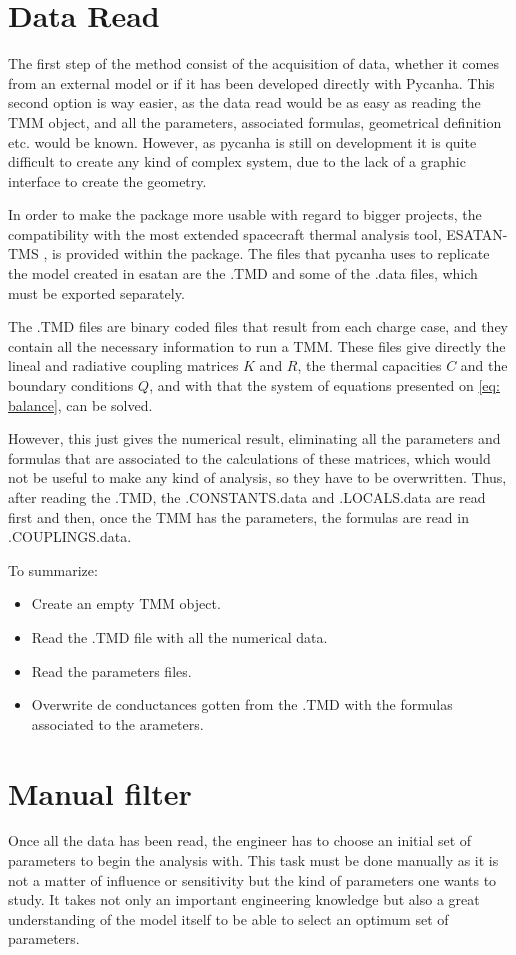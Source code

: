 \section{Data Read}
The first step of the method consist of the acquisition of data, whether it comes from an external model or if it has been developed directly with Pycanha. This second option is way easier, as the data read would be as easy as reading the TMM object, and all the parameters, associated formulas, geometrical definition etc. would be known. However, as pycanha is still on development it is quite difficult to create any kind of complex system, due to the lack of a graphic interface to create the geometry. 

In order to make the package more usable with regard to bigger projects, the compatibility with the most extended  spacecraft thermal analysis tool, ESATAN-TMS \cite{esatan-tms}, is provided within the package. The files that pycanha uses to replicate the model created in esatan are the .TMD and some of the .data files, which must be exported separately.

The .TMD files are binary coded files that result from each charge case, and they contain all the necessary information to run a TMM. These files give directly the lineal and radiative coupling matrices $K$ and $R$, the thermal capacities $C$ and the boundary conditions $Q$, and with that the system of equations presented on \autoref{eq: balance}, can be solved.

However, this just gives the numerical result, eliminating all the parameters and formulas that are associated to the calculations of these matrices, which would not be useful to make any kind of analysis, so they have to be overwritten. Thus, after reading the .TMD, the .CONSTANTS.data and .LOCALS.data are read first and then, once the TMM has the parameters, the formulas are read in .COUPLINGS.data.

To summarize:
\begin{itemize}
\item Create an empty TMM object.
\item Read the .TMD file with all the numerical data.
\item Read the parameters files.
\item Overwrite de conductances gotten from the .TMD with the formulas associated to the arameters.
\end{itemize}

\section{Manual filter}
Once all the data has been read, the engineer has to choose an initial set of parameters to begin the analysis with. This task must be done manually as it is not a matter of influence or sensitivity but the kind of parameters one wants to study. It takes not only an important engineering knowledge but also a great understanding of the model itself to be able to select an optimum set of parameters. 

